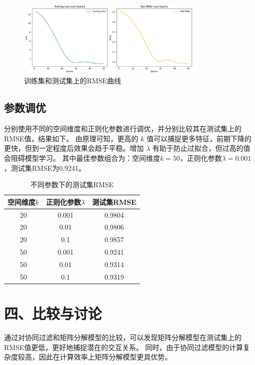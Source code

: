 \documentclass[12pt]{ctexart}
\begin{document}
\begin{figure}[H]
    \centering
    \includegraphics[width=0.8\textwidth]{image/output1.png}
    \caption{训练集和测试集上的RMSE曲线}
\end{figure}

\subsection*{参数调优}

分别使用不同的空间维度和正则化参数进行调优，并分别比较其在测试集上的RMSE值，结果如下。
由原理可知，更高的 $k$ 值可以捕捉更多特征，前期下降的更快，但到一定程度后效果会趋于平稳。增加 $\lambda$ 有助于防止过拟合，但过高的值会阻碍模型学习。
其中最佳参数组合为：空间维度$k=50$，正则化参数$\lambda=0.001$，测试集RMSE为0.9241。

\begin{table}[H]
    \centering
    \begin{tabular}{|c|c|c|}
        \hline
        空间维度$k$ & 正则化参数$\lambda$ & 测试集RMSE \\
        \hline
        20 & 0.001 & 0.9804 \\
        20 & 0.01 & 0.9806 \\
        20 & 0.1 & 0.9857 \\
        50 & 0.001 & 0.9241 \\
        50 & 0.01 & 0.9314 \\
        50 & 0.1 & 0.9319 \\
        \hline
    \end{tabular}
    \caption{不同参数下的测试集RMSE}
\end{table}

\section*{四、比较与讨论}

通过对协同过滤和矩阵分解模型的比较，可以发现矩阵分解模型在测试集上的RMSE值更低，更好地捕捉潜在的交互关系。
同时，由于协同过滤模型的计算复杂度较高，因此在计算效率上矩阵分解模型更具优势。
\end{document}
